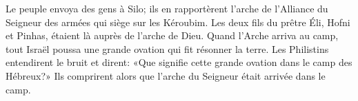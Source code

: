 Le peuple envoya des gens à Silo;
	ils en rapportèrent l’arche de l’Alliance du Seigneur des armées
		qui siège sur les Kéroubim.
Les deux fils du prêtre Éli, Hofni et Pinhas, étaient là auprès de l’arche de Dieu.
Quand l’Arche arriva au camp,
	tout Israël poussa une grande ovation qui fit résonner la terre.
Les Philistins entendirent le bruit et dirent:
	«Que signifie cette grande ovation dans le camp des Hébreux?»
Ils comprirent alors que l’arche du Seigneur était arrivée dans le camp.
